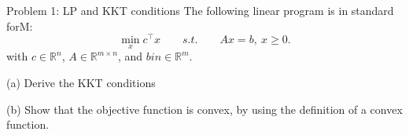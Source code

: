
\begin{problem}{Problem 1: LP and KKT conditions}
  The following linear program is in standard forM:
  \[
    \min_x c^{\top}x \qquad s.t. \qquad Ax = b,\ x\geq 0
  .\] 
  with $c\in \mathbb{R}^{n}$, $A\in \mathbb{R}^{m\times n}$, and $b in \in \mathbb{R}^{m}$.
  
  \medskip (a) Derive the KKT conditions
  
  \medskip (b) Show that the objective function is convex, by using the definition of a convex function.
  
\end{problem}

